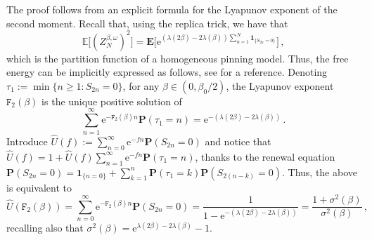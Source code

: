 \documentclass[11pt]{amsart}
\numberwithin{equation}{section}
\newcommand*{\EE}{\mathbb{E}}
\newcommand*{\bE}{\mathbf{E}}
\newcommand*{\bP}{\mathbf{P}}
\newcommand*{\ind}{\mathbf{1}}
\newcommand{\e}{\mathrm{e}}
\newcommand*{\tF}{\mathtt{F}}
\theoremstyle{plain}
\theoremstyle{definition}
\theoremstyle{remark}
\begin{document}
The proof follows from an explicit formula for the Lyapunov exponent of the second moment. 
Recall that, using the replica trick, we have that 
\[
\EE\big[ (Z_N^{\beta,\omega})^2\big] = \bE \Big[ \e^{ (\lambda(2\beta)-2\lambda(\beta)) \sum_{n=1}^N \ind_{\{S_{2n}=0\}}}\Big] \,,
\]
which is the partition function of a homogeneous pinning model.
Thus, the free energy can be implicitly expressed as follows, see \cite[\S2.1]{Gia07} for a reference.
Denoting \(\tau_1 := \min\{n\geq 1: S_{2n}=0\}\), for any \(\beta\in (0,\beta_0/2)\), the Lyapunov exponent \(\tF_2(\beta)\) is the unique positive solution of
\[
\sum_{n=1}^{\infty} \e^{- \tF_2(\beta) n} \bP(\tau_1=n) = \e^{-(\lambda(2\beta)-2\lambda(\beta))} \,.
\]
Introduce \(\hat U(f) := \sum_{n=0}^{\infty} \e^{-f n} \bP(S_{2n}=0)\) and notice that \(\hat U(f) =1+ \hat U(f)\sum_{n=1}^{\infty} \e^{- f n} \bP(\tau_1=n)\), thanks to the renewal equation \(\bP(S_{2n}=0) = \ind_{\{n=0\}} + \sum_{k=1}^n \bP(\tau_1 =k) \bP(S_{2(n-k)}=0)\).
Thus, the above is equivalent to 
\begin{equation}
       \label{eq:formula-F2}
       \hat U(\tF_2(\beta)) = \sum_{n=0}^{\infty} \e^{- \tF_2(\beta) n} \bP(S_{2n}=0) = \frac{1}{1-\e^{-(\lambda(2\beta)-2\lambda(\beta))}} = \frac{1+\sigma^2(\beta)}{ \sigma^2(\beta)} \,,
\end{equation}
recalling also that \(\sigma^2(\beta) =\e^{\lambda(2\beta)-2\lambda(\beta)}-1\).
\end{document}
